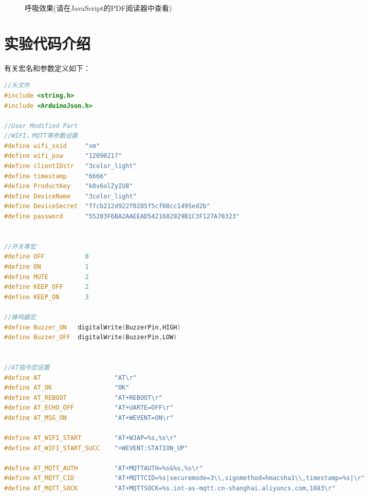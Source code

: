 \documentclass[12pt,hyperref,a4paper,UTF8]{ctexart}
\begin{document}
    \begin{figure}[ht]
        \centering
        \begin{animateinline}{8}
        \end{animateinline}
        \caption{呼吸效果(请在JavaScript的PDF阅读器中查看)}
        \label{fig:animation}
\end{figure}



\section{实验代码介绍}
有关宏名和参数定义如下：
\begin{lstlisting}[language=C++]
    //头文件
#include <string.h>
#include <ArduinoJson.h>

//User Modified Part
//WIFI，MQTT等参数设置
#define wifi_ssid     "xm"    
#define wifi_psw      "12090217"     
#define clientIDstr   "3color_light"
#define timestamp     "6666"
#define ProductKey    "k0v6olZyIU8"
#define DeviceName    "3color_light"
#define DeviceSecret  "ffcb212d922f0285f5cf08cc1495ed2b"
#define password      "55203F6BA2AAEEAD5421602929B1C3F127A70323"


//开关等宏
#define OFF           0
#define ON            1
#define MUTE          2
#define KEEP_OFF      2
#define KEEP_ON       3

//蜂鸣器宏
#define Buzzer_ON   digitalWrite(BuzzerPin,HIGH)
#define Buzzer_OFF  digitalWrite(BuzzerPin,LOW)


//AT指令宏设置
#define AT                    "AT\r"
#define AT_OK                 "OK"
#define AT_REBOOT             "AT+REBOOT\r"
#define AT_ECHO_OFF           "AT+UARTE=OFF\r"
#define AT_MSG_ON             "AT+WEVENT=ON\r"

#define AT_WIFI_START         "AT+WJAP=%s,%s\r"
#define AT_WIFI_START_SUCC    "+WEVENT:STATION_UP"

#define AT_MQTT_AUTH          "AT+MQTTAUTH=%s&%s,%s\r"
#define AT_MQTT_CID           "AT+MQTTCID=%s|securemode=3\\,signmethod=hmacsha1\\,timestamp=%s|\r"
#define AT_MQTT_SOCK          "AT+MQTTSOCK=%s.iot-as-mqtt.cn-shanghai.aliyuncs.com,1883\r"


\end{lstlisting}
\end{document}
